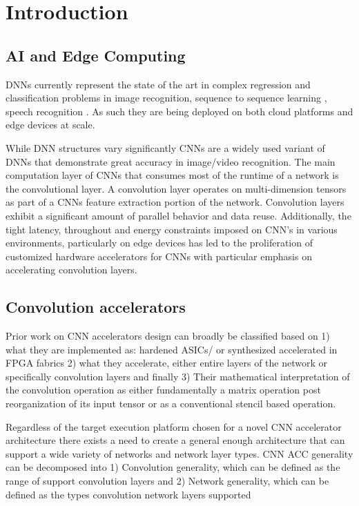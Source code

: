 
\chapter{Introduction}

\section{AI and Edge Computing}
\label{chap:intro:ai_and_edge}

\ac{DNN}s currently represent the state of the art in complex regression and
classification problems in image recognition, sequence to sequence learning
\cite{dnn_is_sota_seq2seq}, speech recognition \cite{dnn_is_sota_speech}. As
such they are being deployed on both cloud platforms and edge devices at scale.

While DNN structures vary significantly \ac{CNN}s are a widely used variant of
\ac{DNN}s that demonstrate great accuracy in image/video recognition. The main
computation layer of \ac{CNN}s that consumes most of the runtime of a network is
the convolutional layer. A convolution layer operates on multi-dimension tensors
as part of a \ac{CNN}s feature extraction portion of the network. Convolution
layers exhibit a significant amount of parallel behavior and data reuse.
Additionally, the tight latency, throughout and energy constraints imposed on
CNN's in various environments, particularly on edge devices has led to the
proliferation of customized hardware accelerators for \ac{CNN}s with particular
emphasis on accelerating convolution layers. 


\section{Convolution accelerators}
\label{chap:intro:cnn_accelerator_design_approaches}

Prior work on \ac{CNN} accelerators design can broadly be
classified based on 1) what they are implemented as: hardened \ac{ASIC}s/ or
synthesized accelerated in \ac{FPGA} fabrics 2)
what they accelerate, either entire layers of the network or
specifically convolution layers and finally 3) Their mathematical interpretation
of the convolution operation as either fundamentally a matrix operation post
reorganization of its input tensor or as a conventional stencil based operation.

Regardless of the target execution platform chosen for a novel \ac{CNN}
accelerator architecture there exists a need to create a general enough
architecture that can support a wide variety of networks and network layer
types. \ac{CNN} \ac{ACC} generality can be decomposed into 1) Convolution
generality, which can be defined as the range of support convolution layers and
2) Network generality, which can be defined as the types convolution network
layers supported 

